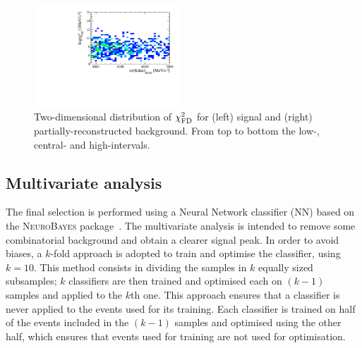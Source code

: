 \begin{figure}[t!]
\includegraphics[width=0.48\textwidth]{RKst/figs/HOP/HOP_bkg_high.pdf}
\caption{Two-dimensional distribution of $\chi^2_{\rm FD}$ \vs \mbcm for (left) \BdToKstee signal and (right) partially-reconstructed background.
From top to bottom the low-, central- and high-\qsq intervals.}
\label{fig:hop}

\end{figure}


\subsection{Multivariate analysis}
\label{sec:RKst_mva}

The final selection is performed using a Neural Network classifier (NN) based on the \textsc{NeuroBayes}
package~\cite{Feindt:2006pm,feindt-2004}. The multivariate analysis is intended to remove
some combinatorial background and obtain a clearer signal peak. In order to avoid biases, a $k$-fold
approach is adopted to train and optimise the classifier, using $k=10$. This method consists in dividing the samples
in $k$ equally sized subsamples; $k$ classifiers are then trained and optimised each on $(k-1)$ samples 
and applied to the $k$th one. This approach ensures that a classifier is never applied to the events used for its training.
Each classifier is trained on half of the events included in the $(k-1)$ samples and optimised using the other half,
which ensures that events used for training are not used for optimisation.
\\

